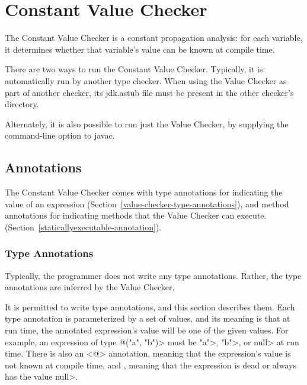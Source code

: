 \htmlhr
\chapter{Constant Value Checker\label{value-checker}}

The Constant Value Checker is a constant propagation analysis: for
each variable, it determines whether that variable's value can be
known at compile time.

There are two ways to run the Constant Value Checker.
Typically, it is automatically run by another type checker.
When using the Value Checker as part of another checker, its
jdk.astub file must be present in the other checker's directory.

Alternately, it is also possible to run just the Value Checker, by
supplying the
command-line option to javac.


\section{Annotations\label{value-checker-annotations}}

The Constant Value Checker comes with type annotations for indicating the
value of an expression (Section~\ref{value-checker-type-annotations}), and
method annotations for indicating methods that the Value Checker can execute.
(Section~\ref{staticallyexecutable-annotation}).


\subsection{Type Annotations\label{value-checker-type-annotations}}

Typically, the programmer does not write any type annotations.  Rather, the
type annotations are inferred by the Value Checker.

It is permitted to write type annotations, and this section describes them.
Each type annotation is parameterized by a set of values, and its meaning
is that at run time, the annotated expression's value will be one of the
given values.  For example, an expression of type 
\<@("a", "b")> must be
\<"a">, \<"b">, or \<null> at run time.
There is also an <@> annotation,
meaning that the expression's value is not known at compile time, and 
, meaning that the expression
is dead or always has the value \<null>.

